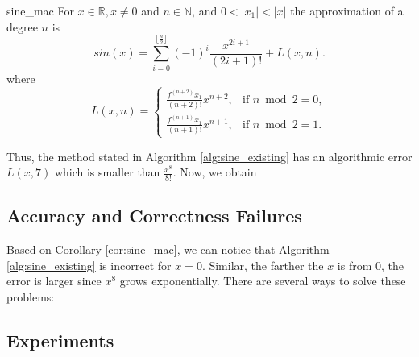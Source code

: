 \documentclass[12pt]{article}
\begin{document}
\begin{CorollaryColor}{}{sine_mac}
    For $x \in \mathbb{R}, x\neq 0$ and $n \in \mathbb{N}$, and $0 < |x_1| < |x|$
    the approximation of a degree $n$ is
    \begin{equation*}
        sin(x) = \sum_{i=0}^{\lfloor\frac{n}{2}\rfloor}
        \left(-1\right)^{ i} \frac{x^{2i + 1}}{(2i+1)!}   +  L(x, n).
    \end{equation*}
    where
    \begin{equation*}
        L(x, n) = \begin{cases}
            \frac{f^{(n + 2)}x_1}{(n+2)!}x^{n+2}, & \text{if } n \bmod 2 = 0,  \\
            \frac{f^{(n + 1)}x_1}{(n+1)!}x^{n+1}, & \text{if } n \bmod 2 = 1.
          \end{cases}
    \end{equation*}
\end{CorollaryColor}
Thus, the method stated in Algorithm \ref{alg:sine_existing} has an algorithmic error $L(x, 7)$ which is smaller than $\frac{x^8}{8!}$.
Now, we obtain
\subsection{Accuracy and Correctness Failures} \label{subsec:acc_and_corr}
Based on Corollary \ref{cor:sine_mac}, we can notice that Algorithm \ref{alg:sine_existing} is incorrect for $x = 0$.
Similar, the farther the $x$ is from 0, the error is larger since $x^8$ grows exponentially.
There are several ways to solve these problems:

\subsection{Experiments}
\end{document}
